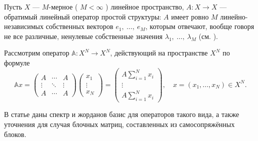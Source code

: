 Пусть \( X \) --- \( M \)-мерное ( \( M < \infty \) ) линейное пространство,
\( A: X\to X \) --- обратимый линейный оператор простой структуры:
\( A \) имеет ровно \( M \) линейно-независимых собственных векторов \( e_1,~\ldots,~e_M \),
которым отвечают, вообще говоря не все различные, ненулевые собственные значения
\( \lambda_1,~\ldots,~\lambda_M \) (см. \cite{baskakov-algebra}).

Рассмотрим оператор
\( \mathbb{A}: X^N\to X^N \), действующий на пространстве \( X^N \) по формуле
\[ \mathbb{A}x =
    \begin{pmatrix}
        A & \cdots & A \\
        \vdots & \ddots & \vdots \\
        A & \cdots & A
    \end{pmatrix}
    \begin{pmatrix}
        x_1 \\
        \vdots \\
        x_N
    \end{pmatrix}
    = \begin{pmatrix}
        A \sum_{i=1}^N x_i \\
        \vdots \\
        A \sum_{i=1}^N x_i
    \end{pmatrix},
    \quad x=(x_1,\ldots,x_N) \in X^N. \]

В статье даны спектр и жорданов базис для операторов такого вида,
а также уточнения для случая блочных матриц, составленных из самосопряжённых блоков.
